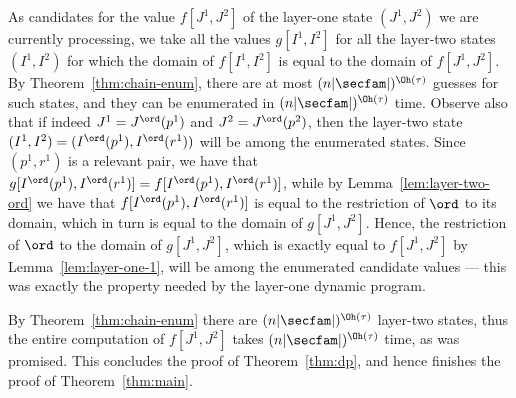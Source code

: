 As candidates for the value $f[J^1,J^2]$ of the layer-one state $(J^1,J^2)$ we are currently processing, we take all the values $g[I^1,I^2]$ for all the layer-two states $(I^1,I^2)$ for which the domain of $f[I^1,I^2]$ is equal to the domain of $f[J^1,J^2]$. By Theorem~\ref{thm:chain-enum}, there are at most $(n|\secfam|)^{\Oh(\tau)}$ guesses for such states, and they can be enumerated in $(n|\secfam|)^{\Oh(\tau)}$ time. Observe also that if indeed $J^1 = J^\ord(p^1)$ and $J^2 = J^\ord(p^2)$, then the layer-two state $(I^1,I^2) = (I^\ord(p^1),I^\ord(r^1))$ will be among the enumerated states. Since $(p^1,r^1)$ is a relevant pair, we have that $g[I^\ord(p^1),I^\ord(r^1)]=f[I^\ord(p^1),I^\ord(r^1)]$, while by Lemma~\ref{lem:layer-two-ord} we have that $f[I^\ord(p^1),I^\ord(r^1)]$ is equal to the restriction of $\ord$ to its domain, which in turn is equal to the domain of $g[J^1,J^2]$. Hence, the restriction of $\ord$ to the domain of $g[J^1,J^2]$, which is exactly equal to $f[J^1,J^2]$ by Lemma~\ref{lem:layer-one-1}, will be among the enumerated candidate values --- this was exactly the property needed by the layer-one dynamic program.


By Theorem~\ref{thm:chain-enum} there are $(n|\secfam|)^{\Oh(\tau)}$ layer-two states, thus the entire computation of $f[J^1,J^2]$
takes $(n|\secfam|)^{\Oh(\tau)}$ time, as was promised.
This concludes the proof of Theorem~\ref{thm:dp}, and hence finishes the proof of Theorem~\ref{thm:main}.
